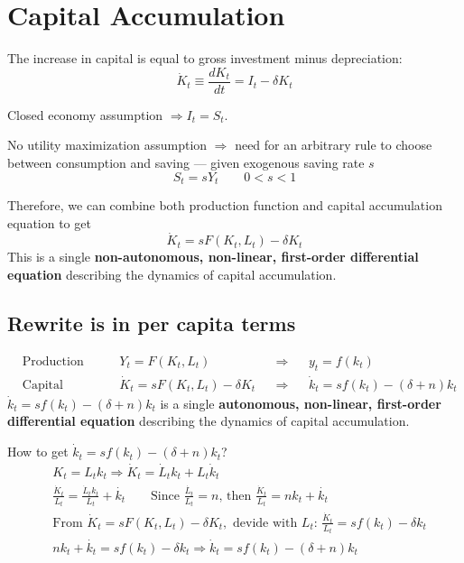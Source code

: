 \section{Capital Accumulation} The increase in capital is equal to gross investment minus depreciation: \[
    \dot{K}_t \equiv \frac{d K_t}{dt} = I_t - \delta K_t
\]

Closed economy assumption $\Longrightarrow I_t = S_t$.

No utility maximization assumption $\Longrightarrow$ need for an arbitrary rule to choose between consumption and saving --- given exogenous saving rate $s$ \[
    S_t = s Y_t \qquad 0<s<1
\]

Therefore, we can combine both production function and capital accumulation equation to get \[
    \dot{K}_{t} = sF(K_t, L_t) - \delta K_t
\]
This is a single \textbf{non-autonomous, non-linear, first-order differential equation} describing the dynamics of capital accumulation.

\subsection{Rewrite is in per capita terms}
\begin{align*}
     & \text{Production Function:}           &  & Y_t = F(K_t, L_t)                       &  & \Longrightarrow &  & y_t=f(k_t)                            \\
     & \text{Capital Accumulation Equation:} &  & \dot{K}_{t} = sF(K_t, L_t) - \delta K_t &  & \Longrightarrow &  & \dot{k}_t = sf(k_t) - (\delta + n)k_t
\end{align*}
\underline{$\dot{k}_t = sf(k_t) - (\delta + n)k_t$} is a single \textbf{autonomous, non-linear, first-order differential equation} describing the dynamics of capital accumulation.

\begin{remark*}
    How to get $\dot{k}_t = sf(k_t) - (\delta + n)k_t$?
    \begin{align*}
         & K_t = L_tk_t                                                                                    \Longrightarrow
        \dot{K}_t = \dot{L}_tk_t + L_t\dot{k}_t                                                                                          \\
         & \frac{\dot{K}_t}{L_t} = \frac{\dot{L}_tk_t}{L_t} + \dot{k_t}
        \qquad\text{Since $\frac{\dot{L_t}}{L_t} = n$, then } \frac{\dot{K}_t}{L_t} = n k_t + \dot{k_t}                                  \\
         & \text{From }\dot{K}_{t} = sF(K_t, L_t) - \delta K_t, \text{ devide with $L_t$: }   \frac{\dot{K}_t}{L_t} = sf(k_t)-\delta k_t \\
         & n k_t + \dot{k_t}  = sf(k_t)-\delta k_t \Longrightarrow \dot{k}_t = sf(k_t) - (\delta + n)k_t
    \end{align*}
\end{remark*}


